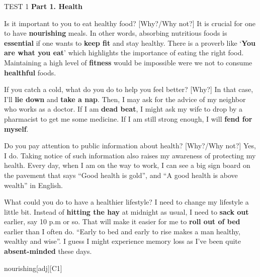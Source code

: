 \begin{glossarymc}[Cambridge 12]
    \begin{test}{TEST 1}
    \noindent
    \textbf{Part 1. Health}
    \begin{qa}{Is it important to you to eat healthy food? [Why?/Why not?]}
    It is crucial for one to have \textbf{nourishing} meals. In other words, absorbing nutritious foods is \textbf{essential} if one wants to \textbf{keep fit} and stay healthy. There is a proverb like ‘\textbf{You are what you eat}’ which highlights the importance of eating the right food. Maintaining a high level of \textbf{fitness} would be impossible were we not to consume \textbf{healthful} foods.
    \end{qa}

    \begin{qa}{If you catch a cold, what do you do to help you feel better? [Why?]}
    In that case, I’ll \textbf{lie down} and \textbf{take a nap}. Then, I may ask for the advice of my neighbor who works as a doctor. If I am \textbf{dead beat}, I might ask my wife to drop by a pharmacist to get me some medicine. If I am still strong enough, I will \textbf{fend for myself}.
    \end{qa}

    \begin{qa}{Do you pay attention to public information about health? [Why?/Why not?]}
    Yes, I do. Taking notice of such information also raises my awareness of protecting my health. Every day, when I am on the way to work, I can see a big sign board on the pavement that says “Good health is gold”, and “A good health is above wealth” in English.
    \end{qa}

    \begin{qa}{What could you do to have a healthier lifestyle?}
    I need to change my lifestyle a little bit. Instead of \textbf{hitting the hay} at midnight as usual, I need to \textbf{sack out} earlier, say 10 p.m or so. That will make it easier for me to \textbf{roll out of bed} earlier than I often do. “Early to bed and early to rise makes a man healthy, wealthy and wise”. I guess I might experience memory loss as I’ve been quite \textbf{absent-minded} these days.
    \end{qa}

        \begin{VocabExplain}[Part 1]
            \begin{ExplainCard}{nourishing}[adj][C1]
            \end{ExplainCard}


\end{VocabExplain}
\end{test}
\end{glossarymc}
